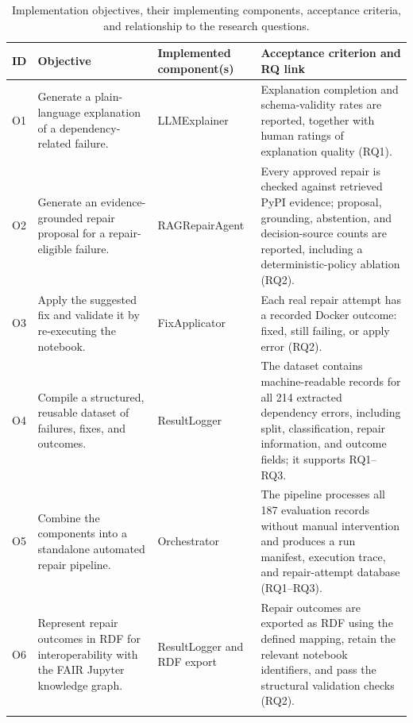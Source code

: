 {\footnotesize
  \renewcommand{\arraystretch}{1.0}
  \begin{longtable}{|>{\raggedright\arraybackslash}p{0.8cm}|>{\raggedright\arraybackslash}p{3.1cm}|>{\raggedright\arraybackslash}p{3.0cm}|>{\raggedright\arraybackslash}p{4.6cm}|}
    \hline
    \textbf{ID} & \textbf{Objective} &
    \textbf{Implemented component(s)} &
    \textbf{Acceptance criterion and RQ link} \\
    \hline
    O1 &
    Generate a plain-language explanation of a dependency-related failure. &
    LLMExplainer &
    Explanation completion and schema-validity rates are reported, together
    with human ratings of explanation quality (RQ1). \\
    \hline
    O2 &
    Generate an evidence-grounded repair proposal for a repair-eligible
    failure. &
    RAGRepairAgent &
    Every approved repair is checked against retrieved PyPI evidence;
    proposal, grounding, abstention, and decision-source counts are reported,
    including a deterministic-policy ablation (RQ2). \\
    \hline
    O3 &
    Apply the suggested fix and validate it by re-executing the notebook. &
    FixApplicator &
    Each real repair attempt has a recorded Docker outcome: fixed, still
    failing, or apply error (RQ2). \\
    \hline
    O4 &
    Compile a structured, reusable dataset of failures, fixes, and outcomes. &
    ResultLogger &
    The dataset contains machine-readable records for all 214 extracted
    dependency errors, including split, classification, repair information,
    and outcome fields; it supports RQ1--RQ3. \\
    \hline
    O5 &
Combine the components into a standalone automated repair pipeline. &
Orchestrator &
The pipeline processes all 187 evaluation records without manual intervention
and produces a run manifest, execution trace, and repair-attempt database
(RQ1--RQ3). \\
\hline
O6 &
Represent repair outcomes in RDF for interoperability with the FAIR Jupyter
knowledge graph. &
ResultLogger and RDF export &
Repair outcomes are exported as RDF using the defined mapping, retain the
relevant notebook identifiers, and pass the structural validation checks
(RQ2). \\
        \hline
    \caption{Implementation objectives, their implementing components,
    acceptance criteria, and relationship to the research questions.}
    \label{tab:intro-objectives}
\end{longtable}
}

